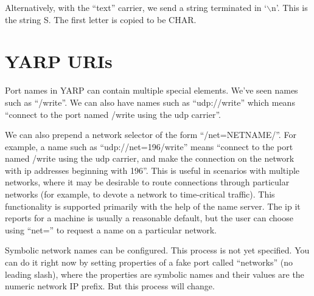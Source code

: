 \noindent
Alternatively, with the ``text'' carrier, we send a string terminated
in `$\backslash$n'.  This is the string S.  The first letter is copied
to be CHAR.



\section{YARP URIs}

Port names in YARP can contain multiple special elements.
We've seen names such as ``/write''.  We can also have
names such as ``udp://write'' which means ``connect
to the port named /write using the udp carrier''.

We can also prepend a network selector of the form
``/net=NETNAME/''.  For example, a name such as
``udp://net=196/write'' means ``connect to the 
port named /write using the udp carrier, and make the
connection on the network with ip addresses beginning with
196''.
%
This is useful in scenarios with multiple networks, where it may be
desirable to route connections through particular networks (for
example, to devote a network to time-critical traffic).  This
functionality is supported primarily with the help of the name server.
The ip it reports for a machine is usually a reasonable default, but
the user can choose using ``net='' to request a name on a particular
network.

Symbolic network names can be configured.  This process is not yet
specified.  You can do it right now by setting properties of a fake
port called ``networks'' (no leading slash), where the properties are
symbolic names and their values are the numeric network IP prefix.
But this process will change.





